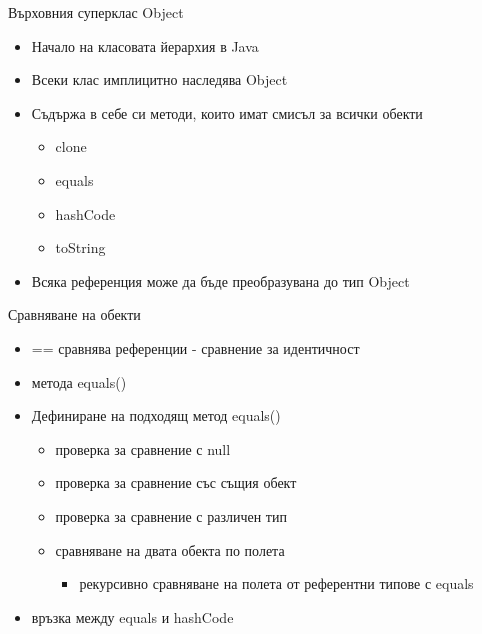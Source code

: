 \documentclass{beamer}
\begin{document}
\begin{frame}{Върховния суперклас Object}
  \transdissolve
  \begin{itemize}
  \item Начало на класовата йерархия в Java
  \item Всеки клас имплицитно наследява Object
  \item Съдържа в себе си методи, които имат смисъл за всички обекти
    \begin{itemize}
      \item clone
      \item equals
      \item hashCode
      \item toString
    \end{itemize}
  \item Всяка референция може да бъде преобразувана до тип Object
  \end{itemize}
\end{frame}

\begin{frame}{Сравняване на обекти}
  \transdissolve
  \begin{itemize}
  \item == сравнява референции - сравнение за идентичност
  \item метода equals()
  \item Дефиниране на подходящ метод equals()
    \begin{itemize}
      \item проверка за сравнение с null
      \item проверка за сравнение със същия обект
      \item проверка за сравнение с различен тип
      \item сравняване на двата обекта по полета
      \begin{itemize}
        \item рекурсивно сравняване на полета от референтни типове с equals
      \end{itemize}
    \end{itemize}
  \item връзка между equals и hashCode
  \end{itemize}
\end{frame}
\end{document}
